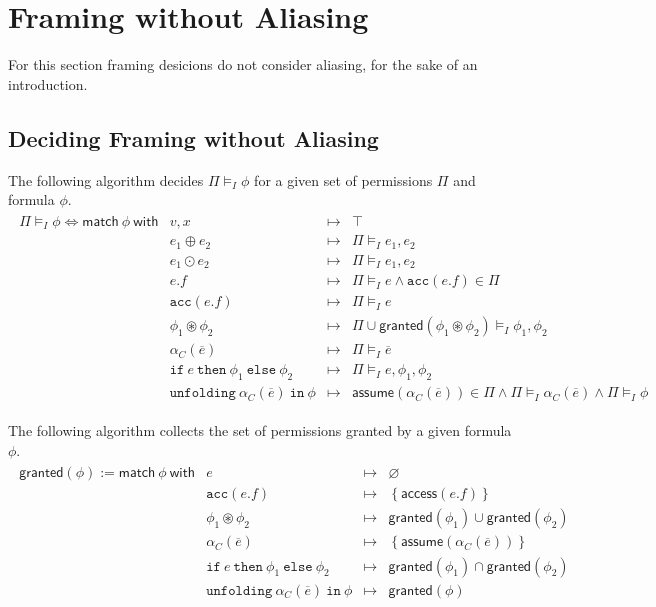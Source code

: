 \documentclass{article}
\newcommand{\tsf}{\textsf}
\newcommand{\ttt}{\texttt}
\newcommand{\access}{\tsf{access}}
\newcommand{\assume}{\tsf{assume}}
\newcommand{\frames}{\vDash_I}
\newcommand{\mt}{\mapsto}
\newcommand{\set}[1]{\left\{ #1 \right\}}
\newcommand{\oast}{\circledast}
\renewcommand{\vec}{\overline}
\renewcommand{\empty}{\varnothing}
\newcommand{\cif}{\ttt{if}}
\newcommand{\cthen}{\ttt{then}}
\newcommand{\celse}{\ttt{else}}
\newcommand{\cacc}{\ttt{acc}}
\newcommand{\cunfolding}{\ttt{unfolding}}
\newcommand{\cin}{\ttt{in}}
\newcommand{\granted}{\tsf{granted}}
\begin{document}
\section{Framing without Aliasing}

For this section framing desicions do not consider aliasing, for the sake of an introduction.

\subsection{Deciding Framing without Aliasing}

\noindent
The following algorithm decides $\Pi \frames \phi$ for a given set of permissions $\Pi$ and formula $\phi$.
\begin{align*}
\begin{array}{r|lrl}
\Pi \frames \phi
\iff \tsf{match} \ \phi \ \tsf{with}
%
%
& v, x                &\mt& \top
\\
& e_1 \oplus e_2      &\mt& \Pi \frames e_1, e_2
\\
& e_1 \odot e_2       &\mt& \Pi \frames e_1, e_2
\\
& e.f                 &\mt& \Pi \frames e
                      \land \cacc(e.f) \in \Pi
\\
%
& \cacc(e.f)          &\mt& \Pi \frames e
\\
& \phi_1 \oast \phi_2 &\mt& \Pi \cup \tsf{granted}(\phi_1 \oast \phi_2) \frames \phi_1, \phi_2
\\
& \alpha_C(\vec{e})   &\mt& \Pi \frames \vec{e}
\\
& \cif \ e \ \cthen \ \phi_1 \ \celse \ \phi_2
                      &\mt& \Pi \frames e, \phi_1, \phi_2
\\
& \cunfolding \ \alpha_C(\vec{e}) \ \cin \ \phi
                      &\mt& \assume(\alpha_C(\vec{e})) \in \Pi
                      \land \Pi \frames \alpha_C(\vec{e})
                      \land \Pi \frames \phi
\end{array}
\end{align*}

\noindent
The following algorithm collects the set of permissions granted by a given formula $\phi$.
\begin{align*}
\begin{array}{r|lrl}
\granted(\phi)
:= \tsf{match} \ \phi \ \tsf{with}
%
%
& e &\mt& \empty
\\
%
%
& \cacc(e.f)          &\mt& \set{ \access(e.f) }
\\
& \phi_1 \oast \phi_2 &\mt& \granted(\phi_1)
                      \cup  \granted(\phi_2)
\\
& \alpha_C(\vec{e})   &\mt& \set{ \assume(\alpha_C(\vec{e})) }
\\
& \cif \ e \ \cthen \ \phi_1 \ \celse \ \phi_2
                      &\mt& \granted(\phi_1) \cap \granted(\phi_2)
\\
& \cunfolding \ \alpha_C(\vec{e}) \ \cin \ \phi
                      &\mt& \granted(\phi)
\end{array}
\end{align*}
\end{document}

